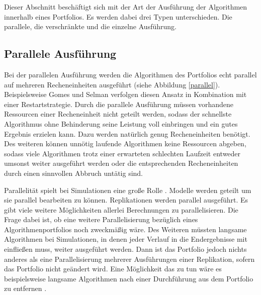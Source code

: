 Dieser Abschnitt beschäftigt sich mit der Art der Ausführung der Algorithmen innerhalb eines Portfolios. Es werden dabei drei Typen unterschieden. Die parallele, die verschränkte und die einzelne Ausführung.

\subsection{Parallele Ausführung}

Bei der parallelen Ausführung werden die Algorithmen des Portfolios echt parallel auf mehreren Recheneinheiten ausgeführt (siehe Abbildung \ref{parallel}). Beispielsweise Gomes und Selman \cite{gomesselman97} verfolgen diesen Ansatz in Kombination mit einer Restartstrategie. Durch die parallele Ausführung müssen vorhandene Ressourcen einer Recheneinheit nicht geteilt werden, sodass der schnellste Algorithmus ohne Behinderung seine Leistung voll einbringen und ein gutes Ergebnis erzielen kann. Dazu werden natürlich genug Recheneinheiten benötigt. Des weiteren können unnötig laufende Algorithmen keine Ressourcen abgeben, sodass viele Algorithmen trotz einer erwarteten schlechten Laufzeit entweder umsonst weiter ausgeführt werden oder die entsprechenden Recheneinheiten durch einen sinnvollen Abbruch untätig sind.

Parallelität spielt bei Simulationen eine große Rolle \cite{ewald10, himmelspach09}. Modelle werden geteilt um sie parallel bearbeiten zu können. Replikationen werden parallel ausgeführt. Es gibt viele weitere Möglichkeiten allerlei Berechnungen zu parallelisieren. Die Frage dabei ist, ob eine weitere Parallelisierung bezüglich eines Algorithmenportfolios noch zweckmäßig wäre. Des Weiteren müssten langsame Algorithmen bei Simulationen, in denen jeder Verlauf in die Endergebnisse mit einfließen muss, weiter ausgeführt werden. Dann ist das Portfolio jedoch nichts anderes als eine Parallelisierung mehrerer Ausführungen einer Replikation, sofern das Portfolio nicht geändert wird. Eine Möglichkeit das zu tun wäre es beispielsweise langsame Algorithmen nach einer Durchführung aus dem Portfolio zu entfernen \cite{ewald10}. \\

